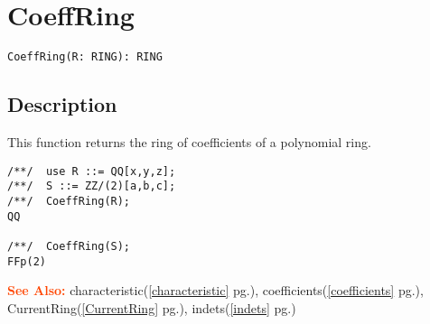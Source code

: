 \documentclass[a4paper]{mybook}
\newenvironment{command}{}{} %
\newcommand\SeeAlso{\par\textcolor{OrangeRed}{\textbf{\large See Also: }}}
\begin{document}
\section{CoeffRing}
\label{CoeffRing}
\begin{command} %


\begin{Verbatim}[label=syntax, rulecolor=\color{MidnightBlue},
frame=single]
CoeffRing(R: RING): RING
\end{Verbatim}


\subsection*{Description}

This function returns the ring of coefficients of a polynomial ring.
\begin{Verbatim}[label=example, rulecolor=\color{PineGreen}, frame=single]
/**/  use R ::= QQ[x,y,z];
/**/  S ::= ZZ/(2)[a,b,c];
/**/  CoeffRing(R);
QQ

/**/  CoeffRing(S);
FFp(2)
\end{Verbatim}


\SeeAlso %
  characteristic(\ref{characteristic} pg.\pageref{characteristic}), 
    coefficients(\ref{coefficients} pg.\pageref{coefficients}), 
    CurrentRing(\ref{CurrentRing} pg.\pageref{CurrentRing}), 
    indets(\ref{indets} pg.\pageref{indets})
\end{command} %
\end{document}
